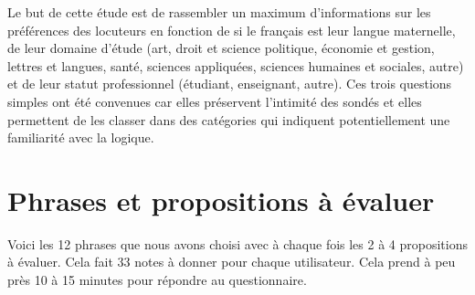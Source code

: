 \documentclass[11pt,letterpaper]{article}
\begin{document}
Le but de cette étude est de rassembler un maximum d'informations sur les préférences des locuteurs en fonction de si le français est leur langue maternelle, de leur domaine d'étude (art, droit et science politique, économie et gestion, lettres et langues, santé, sciences appliquées, sciences humaines et sociales, autre) et de leur statut professionnel (étudiant, enseignant, autre). Ces trois questions simples ont été convenues car elles préservent l'intimité des sondés et elles permettent de les classer dans des catégories qui indiquent potentiellement une familiarité avec la logique.

\section{Phrases et propositions à évaluer}

Voici les 12 phrases que nous avons choisi avec à chaque fois les 2 à 4 propositions à évaluer. Cela fait 33 notes à donner pour chaque utilisateur. Cela prend à peu près 10 à 15 minutes pour répondre au questionnaire.
\end{document}
